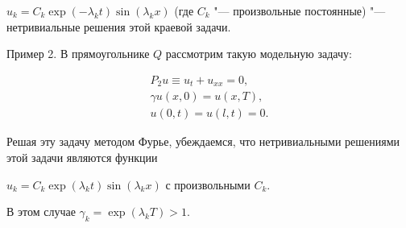 $u_k=C_k \exp(-\lambda _k t)\sin (\lambda _k x) $ (где $C_k$ "--- произвольные постоянные) "---  нетривиальные  решения этой краевой задачи.



\smallskip



{\small\sc Пример 2.}  В прямоугольнике  $Q$ рассмотрим такую модельную задачу:

\begin{gather}

P_2 u \equiv u_t+u_{xx} =0,

\\

\gamma u (x, 0)=u (x, T),  

\\

u(0,t)=u(l ,t)=0. 

\end{gather}

Решая эту задачу методом Фурье, убеждаемся, что нетривиальными решениями этой задачи являются функции 

$u_k=C_k \exp( \lambda_k t) \sin ( \lambda_k x)$ с произвольными $C_k$. 

В этом случае $\gamma _k=\exp (\lambda _k T)>1. $




\smallskip









